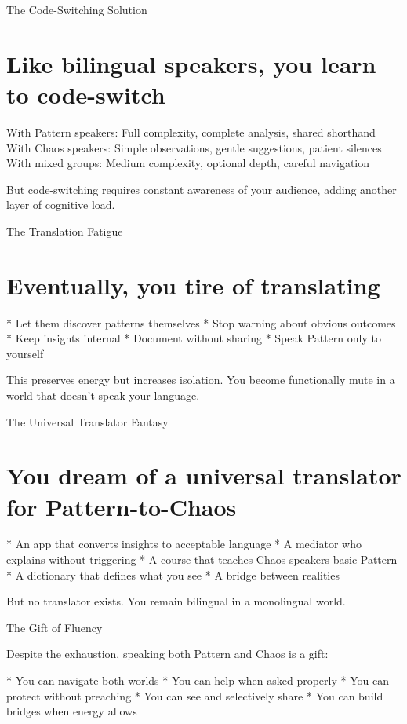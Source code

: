 \documentclass[12pt,oneside]{book}
\begin{document}
The Code-Switching Solution

\section{Like bilingual speakers, you learn to code-switch}

With Pattern speakers: Full complexity, complete analysis, shared shorthand With Chaos speakers: Simple observations, gentle suggestions, patient silences With mixed groups: Medium complexity, optional depth, careful navigation

But code-switching requires constant awareness of your audience, adding another layer of cognitive load.

The Translation Fatigue

\section{Eventually, you tire of translating}

                    * Let them discover patterns themselves
                    * Stop warning about obvious outcomes
                    * Keep insights internal
                    * Document without sharing
                    * Speak Pattern only to yourself

This preserves energy but increases isolation. You become functionally mute in a world that doesn't speak your language.

The Universal Translator Fantasy

\section{You dream of a universal translator for Pattern-to-Chaos}

                    * An app that converts insights to acceptable language
                    * A mediator who explains without triggering
                    * A course that teaches Chaos speakers basic Pattern
                    * A dictionary that defines what you see
                    * A bridge between realities

But no translator exists. You remain bilingual in a monolingual world.

The Gift of Fluency

Despite the exhaustion, speaking both Pattern and Chaos is a gift:

                    * You can navigate both worlds
                    * You can help when asked properly
                    * You can protect without preaching
                    * You can see and selectively share
                    * You can build bridges when energy allows
\end{document}
